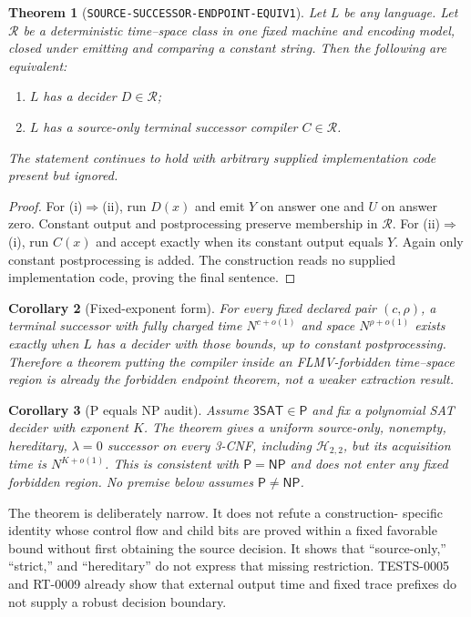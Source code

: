 \documentclass[11pt]{article}
\newtheorem{theorem}{Theorem}
\newtheorem{corollary}[theorem]{Corollary}
\newcommand{\SAT}{\mathsf{3SAT}}
\newcommand{\Htwo}{\mathcal H_{2,2}}
\begin{document}
\begin{theorem}[\texttt{SOURCE-SUCCESSOR-ENDPOINT-EQUIV1}]
Let $L$ be any language.  Let $\mathcal R$ be a deterministic time--space
class in one fixed machine and encoding model, closed under emitting and
comparing a constant string.  Then the following are equivalent:
\begin{enumerate}[label=(\roman*)]
\item $L$ has a decider $D\in\mathcal R$;
\item $L$ has a source-only terminal successor compiler $C\in\mathcal R$.
\end{enumerate}
The statement continues to hold with arbitrary supplied implementation code
present but ignored.
\end{theorem}

\begin{proof}
For (i)$\Rightarrow$(ii), run $D(x)$ and emit $Y$ on answer one and $U$ on
answer zero.  Constant output and postprocessing preserve membership in
$\mathcal R$.  For (ii)$\Rightarrow$(i), run $C(x)$ and accept exactly when
its constant output equals $Y$.  Again only constant postprocessing is added.
The construction reads no supplied implementation code, proving the final
sentence.
\end{proof}

\begin{corollary}[Fixed-exponent form]
For every fixed declared pair $(c,\rho)$, a terminal successor with fully
charged time $N^{c+o(1)}$ and space $N^{\rho+o(1)}$ exists exactly when $L$
has a decider with those bounds, up to constant postprocessing.  Therefore a
theorem putting the compiler inside an FLMV-forbidden time--space region is
already the forbidden endpoint theorem, not a weaker extraction result.
\end{corollary}

\begin{corollary}[P equals NP audit]
Assume $\SAT\in\mathsf P$ and fix a polynomial SAT decider with exponent
$K$.  The theorem gives a uniform source-only, nonempty, hereditary,
$\lambda=0$ successor on every 3-CNF, including $\Htwo$, but its acquisition
time is $N^{K+o(1)}$.  This is consistent with $\mathsf P=\mathsf{NP}$ and
does not enter any fixed forbidden region.  No premise below assumes
$\mathsf P\ne\mathsf{NP}$.
\end{corollary}

The theorem is deliberately narrow.  It does not refute a construction-
specific identity whose control flow and child bits are proved within a
fixed favorable bound without first obtaining the source decision.  It shows
that ``source-only,'' ``strict,'' and ``hereditary'' do not express that
missing restriction.  TESTS-0005 and RT-0009 already show that external
output time and fixed trace prefixes do not supply a robust decision boundary.
\end{document}

